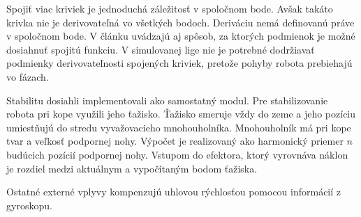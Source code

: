 Spojiť viac kriviek je jednoduchá záležitosť v spoločnom bode. Avšak takáto krivka nie je derivovateľná vo všetkých bodoch. Deriváciu nemá definovanú práve v spoločnom bode. V článku uvádzajú aj spôsob, za ktorých podmienok je možné dosiahnuť spojitú funkciu. V simulovanej lige nie je potrebné dodržiavať podmienky derivovateľnosti spojených kriviek, pretože pohyby robota prebiehajú vo fázach.

Stabilitu dosiahli implementovali ako samostatný modul. Pre stabilizovanie robota pri kope využili jeho ťažisko. Ťažisko smeruje vždy do zeme a jeho pozíciu umiestňujú do stredu vyvažovacieho mnohouholníka. Mnohouholník má pri kope tvar a veľkosť podpornej nohy. Výpočet je realizovaný ako harmonický priemer $n$ budúcich pozícií podpornej nohy. Vstupom do efektora, ktorý vyrovnáva náklon je rozdiel medzi aktuálnym a vypočítaným bodom ťažiska.

Ostatné externé vplyvy kompenzujú uhlovou rýchlosťou pomocou informácií z gyroskopu. %